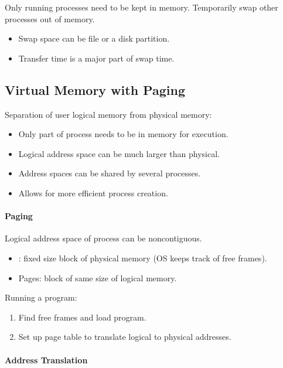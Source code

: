 \documentclass[twocolumn,english]{article}
\let\emph\relax
\begin{document}
Only running processes need to be kept in memory. Temporarily swap
other processes out of memory.
\begin{itemize}
\item Swap space can be file or a disk partition.
\item Transfer time is a major part of swap time.
\end{itemize}

\subsection{Virtual Memory with Paging}

Separation of user logical memory from physical memory:
\begin{itemize}
\item Only part of process needs to be in memory for execution.
\item Logical address space can be much larger than physical.
\item Address spaces can be shared by several processes.
\item Allows for more efficient process creation.
\end{itemize}

\paragraph{Paging}

Logical address space of process can be noncontiguous.
\begin{itemize}
\item \emph{Frames}: fixed size block of physical memory (OS keeps track
of free frames).
\item Pages: block of same size of logical memory.
\end{itemize}
Running a program:
\begin{enumerate}
\item Find free frames and load program.
\item Set up page table to translate logical to physical addresses.
\end{enumerate}

\paragraph{Address Translation}
\end{document}
